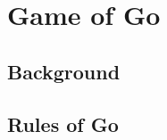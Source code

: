 \documentclass[../math194_paper.tex]{subfiles}
\begin{document}
\section{Game of Go}

\subsection{Background}

\subsection{Rules of Go}
\end{document}
